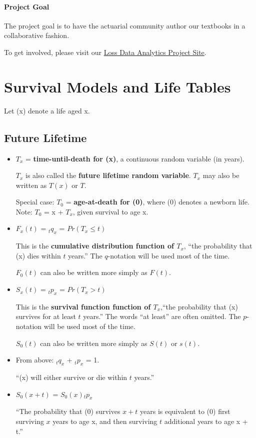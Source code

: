 \documentclass[]{book}
\begin{document}
\subsubsection*{Project Goal}\label{project-goal}

The project goal is to have the actuarial community author our textbooks
in a collaborative fashion.

To get involved, please visit our
\href{https://sites.google.com/a/wisc.edu/loss-data-analytics/}{Loss
Data Analytics Project Site}.

\chapter{Survival Models and Life
Tables}\label{survival-models-and-life-tables}

Let (x) denote a life aged x.

\section{Future Lifetime}\label{future-lifetime}

\begin{itemize}
\item
  \(T_x\) = \textbf{time-until-death for (x)}, a continuous random
  variable (in years).

  \(T_x\) is also called the \textbf{future lifetime random variable}.
  \(T_x\) may also be written as \(T(x)\) or \(T\).

  Special case: \(T_0\) = \textbf{age-at-death for (0)}, where (0)
  denotes a newborn life. Note: \(T_0\) = x + \(T_x\), given survival to
  age x.
\item
  \(F_x(t)\) = \({}_{t}q_x\) = \(Pr(T_x \le t)\)

  This is the \textbf{cumulative distribution function of \(T_x\)},
  ``the probability that (x) dies within \(t\) years.'' The
  \(q\)-notation will be used most of the time.

  \(F_0(t)\) can also be written more simply as \(F(t)\).
\item
  \(S_x(t)\) = \({}_{t}p_x\) = \(Pr(T_x > t)\)

  This is the \textbf{survival function function of \(T_x\)},``the
  probability that (x) survives for at least \(t\) years.'' The words
  ``at least'' are often omitted. The \(p\)-notation will be used most
  of the time.

  \(S_0(t)\) can also be written more simply as \(S(t)\) or \(s(t)\).
\item
  From above: \({}_{t}q_x\) + \({}_{t}p_x\) = 1.

  ``(x) will either survive or die within \(t\) years.''
\item
  \(S_0(x + t)\) = \(S_0(x)\)\({}_{t}p_x\)

  ``The probability that (0) survives \(x + t\) years is equivalent to
  (0) first surviving \(x\) years to age x, and then surviving \(t\)
  additional years to age x + t.''
\end{itemize}
\end{document}
